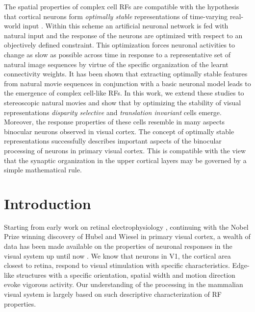 The spatial properties of complex cell RFs are compatible with the
hypothesis that cortical neurons form \textit{optimally stable}
representations of time-varying real-world input
\citep{hyvarinen2001a,einhauser2002a, kording2004a, wiskott2002a}. Within
this scheme an artificial neuronal network is fed with natural input and
the response of the neurons are optimized with respect to an objectively
defined constraint. This optimization forces neuronal activities to change
as slow as possible across time in response to a representative set of
natural image sequences by virtue of the specific organization of the
learnt connectivity weights. It has been shown that extracting optimally
stable features from natural movie sequences in conjunction with a basic
neuronal model leads to the emergence of complex cell-like RFs. In this
work, we extend these studies to stereoscopic natural movies and show that
by optimizing the stability of visual representations \textit{disparity
selective} and \textit{translation invariant} cells emerge. Moreover, the
response properties of these cells resemble in many aspects binocular
neurons observed in visual cortex. The concept of optimally stable
representations successfully describes important aspects of the binocular
processing of neurons in primary visual cortex. This is compatible with the
view that the synaptic organization in the upper cortical layers may be
governed by a simple mathematical rule.


\section{Introduction}



Starting from early work on retinal electrophysiology \citep{kuffler1953a,
barlow1953a}, continuing with the Nobel Prize winning discovery of Hubel
and Wiesel \citep{hubel1962a} in primary visual cortex, a wealth of data
has been made available on the properties of neuronal responses in the
visual system up until now \citep{ringach2004b}. We know that neurons in
V1, the cortical area closest to retina, respond to visual stimulation with
specific characteristics. Edge-like structures with a specific orientation,
spatial width and motion direction evoke vigorous activity. Our
understanding of the processing in the mammalian visual system is largely
based on such descriptive characterization of RF properties. 

